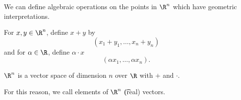 
We can define algebraic operations on the points in $\R^n$ which have geometric interpretations.

For $x, y \in \R^n$, define $x + y$ by
  \[
(x_1 +y_1, \dots, x_n + y_n)
  \]
and for $\alpha \in \R$, define $\alpha \cdot x$
  \[
(\alpha x_1, \dots, \alpha x_n).
  \]

\begin{proposition}
$\R^n$ is a vector space of dimension $n$ over $\R$ with $+$ and $\cdot$.
\end{proposition}

For this reason, we call elements of $\R^n$ \t{(real) vectors}.

\blankpage
